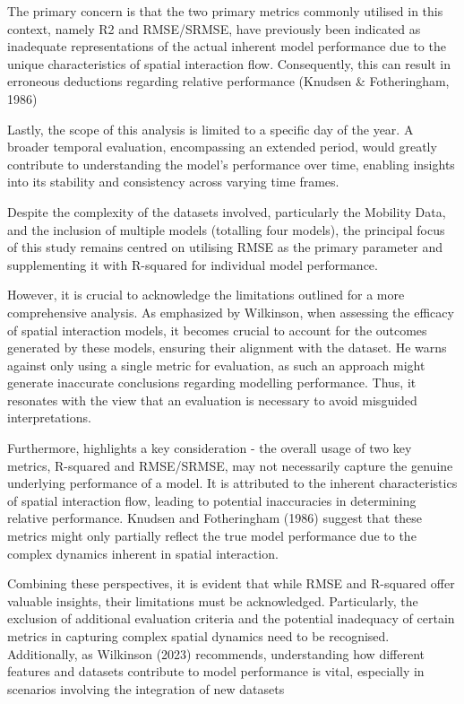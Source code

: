         The primary concern is that the two primary metrics commonly utilised in this context, namely R2 and RMSE/SRMSE, have previously been indicated as inadequate representations of the actual inherent model performance due to the unique characteristics of spatial interaction flow. Consequently, this can result in erroneous deductions regarding relative performance (Knudsen \& Fotheringham, 1986) \cite{wilkinsonSpatialInteractionModels2023}
        
        Lastly, the scope of this analysis is limited to a specific day of the year. A broader temporal evaluation, encompassing an extended period, would greatly contribute to understanding the model's performance over time, enabling insights into its stability and consistency across varying time frames.

        Despite the complexity of the datasets involved, particularly the Mobility Data, and the inclusion of multiple models (totalling four models), the principal focus of this study remains centred on utilising RMSE as the primary parameter and supplementing it with R-squared for individual model performance.

        However, it is crucial to acknowledge the limitations \cite{wilkinsonSpatialInteractionModels2023} outlined for a more comprehensive analysis. As emphasized by Wilkinson, when assessing the efficacy of spatial interaction models, it becomes crucial to account for the outcomes generated by these models, ensuring their alignment with the dataset. He warns against only using a single metric for evaluation, as such an approach might generate inaccurate conclusions regarding modelling performance. Thus, it resonates with the view that an evaluation is necessary to avoid misguided interpretations.
        
        Furthermore, \cite{wilkinsonSpatialInteractionModels2023} highlights a key consideration - the overall usage of two key metrics, R-squared and RMSE/SRMSE, may not necessarily capture the genuine underlying performance of a model. It is attributed to the inherent characteristics of spatial interaction flow, leading to potential inaccuracies in determining relative performance. Knudsen and Fotheringham (1986) suggest that these metrics might only partially reflect the true model performance due to the complex dynamics inherent in spatial interaction.
        
        Combining these perspectives, it is evident that while RMSE and R-squared offer valuable insights, their limitations must be acknowledged. Particularly, the exclusion of additional evaluation criteria and the potential inadequacy of certain metrics in capturing complex spatial dynamics need to be recognised. Additionally, as Wilkinson (2023) recommends, understanding how different features and datasets contribute to model performance is vital, especially in scenarios involving the integration of new datasets
        







